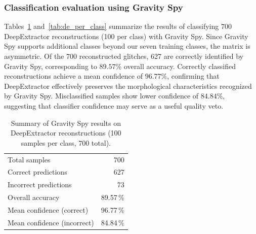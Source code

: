 \documentclass[reprint,nofootinbib,amsmath,amssymb,aps,floatfix]{revtex4-2}
\begin{document}

\subsubsection{Classification evaluation using Gravity Spy}

Tables~\ref{tab:de_summary} and~\ref{tab:de_per_class} summarize the results of classifying 700 DeepExtractor reconstructions (100 per class) with Gravity Spy.
Since Gravity Spy supports additional classes beyond our seven training classes, the matrix is asymmetric.
Of the 700 reconstructed glitches, 627 are correctly identified by Gravity Spy, corresponding to $89.57\%$ overall accuracy.
Correctly classified reconstructions achieve a mean confidence of $96.77\%$, confirming that DeepExtractor effectively preserves the morphological characteristics recognized by Gravity Spy.
Misclassified samples show lower confidence of $84.84\%$, suggesting that classifier confidence may serve as a useful quality veto.


\begin{table}[h]
\centering
\caption{Summary of Gravity Spy results on DeepExtractor reconstructions (100 samples per class, 700 total).}
\label{tab:de_summary}
\begin{tabular}{l r}
\toprule
Total samples                  & 700       \\
Correct predictions            & 627       \\
Incorrect predictions          & 73        \\
\midrule
Overall accuracy               & 89.57\,\% \\
Mean confidence (correct)      & 96.77\,\% \\
Mean confidence (incorrect)    & 84.84\,\% \\
\bottomrule
\end{tabular}
\end{table}
\end{document}
